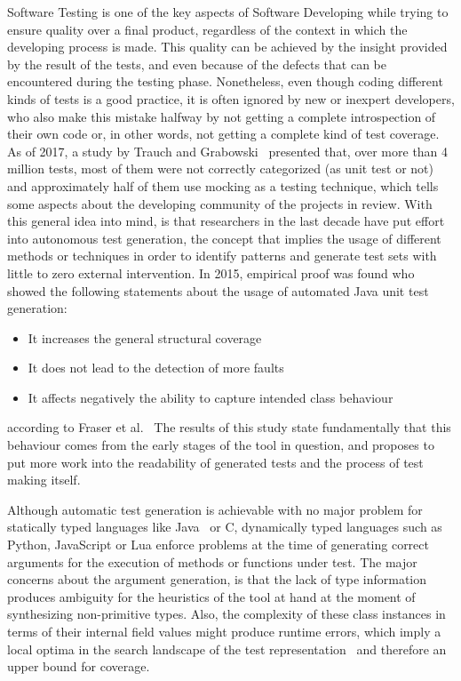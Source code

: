 \documentclass[%
  chapterprefix=false,%
  open=right,%
  twoside=true,%
  paper=a4,%
  logofile={Figures/logo.png},%
  thesistype=master,%
  UKenglish,%
]{se2thesis}
\begin{document}
Software Testing is one of the key aspects of Software Developing while trying to ensure quality over a final product, regardless of the context in which the developing process is made.
This quality can be achieved by the insight provided by the result of the tests, and even because of the defects that can be encountered during the testing phase.
Nonetheless, even though coding different kinds of tests is a good practice, it is often ignored by new or inexpert developers, who also make this mistake halfway by not getting a complete introspection of their own code or, in other words, not getting a complete kind of test coverage.
As of 2017, a study by Trauch and Grabowski~\cite{DBLP:conf/icst/TrautschG17} presented that, over more than 4 million tests, most of them were not correctly categorized (as unit test or not) and approximately half of them use mocking as a testing technique, which tells some aspects about the developing community of the projects in review. 
With this general idea into mind, is that researchers in the last decade   have put effort into autonomous test generation, the concept that implies the usage of different methods or techniques in order to identify patterns and generate test sets with little to zero external intervention.
In 2015, empirical proof was found who showed the following statements about the usage of automated Java unit test generation:
\begin{itemize}
  \item It increases the general structural coverage
  \item It does not lead to the detection of more faults
  \item It affects negatively the ability to capture intended class behaviour
\end{itemize}
according to Fraser et al.~\cite{DBLP:journals/tosem/FraserSMAP15}
The results of this study state fundamentally that this behaviour  comes from the early stages of the tool in question, and proposes to put more work into the readability of generated tests and  the process of test making itself.

Although automatic test generation is achievable with no major problem for statically typed languages like Java~\cite{DBLP:journals/tse/FraserA13} or C, dynamically typed languages such as Python, JavaScript or Lua enforce problems at the time of generating correct arguments for the execution of methods or functions under test.
The major concerns about the argument generation, is that the lack of type information produces ambiguity for the heuristics of the tool at hand at the moment of synthesizing non-primitive types.
Also, the complexity of these class instances in terms of their internal field values might produce runtime errors, which imply a local optima in the search landscape of the test representation~\cite{DBLP:conf/sigsoft/0001O00D21} and therefore an upper bound for coverage.
\end{document}
